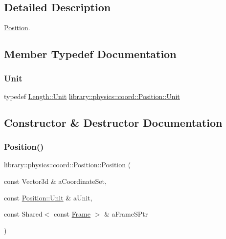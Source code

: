 \subsection{Detailed Description}
\hyperlink{classlibrary_1_1physics_1_1coord_1_1_position}{Position}. 

\subsection{Member Typedef Documentation}
\mbox{\label{classlibrary_1_1physics_1_1coord_1_1_position_aa89cc8ffbcb33e1b347e51b179183613}} 
\subsubsection{\texorpdfstring{Unit}{Unit}}
{\footnotesize\ttfamily typedef \hyperlink{classlibrary_1_1physics_1_1units_1_1_length_a3b8b39cd245cf6b19dc34459baeccb18}{Length\+::\+Unit} \hyperlink{classlibrary_1_1physics_1_1units_1_1_length_a3b8b39cd245cf6b19dc34459baeccb18}{library\+::physics\+::coord\+::\+Position\+::\+Unit}}



\subsection{Constructor \& Destructor Documentation}
\mbox{\label{classlibrary_1_1physics_1_1coord_1_1_position_ac69f2ea85b82a43db1793f7e9cb183f8}} 
\subsubsection{\texorpdfstring{Position()}{Position()}\hspace{0.1cm}{\footnotesize\ttfamily [1/2]}}
{\footnotesize\ttfamily library\+::physics\+::coord\+::\+Position\+::\+Position (\begin{DoxyParamCaption}\item[{const Vector3d \&}]{a\+Coordinate\+Set,  }\item[{const \hyperlink{classlibrary_1_1physics_1_1units_1_1_length_a3b8b39cd245cf6b19dc34459baeccb18}{Position\+::\+Unit} \&}]{a\+Unit,  }\item[{const Shared$<$ const \hyperlink{classlibrary_1_1physics_1_1coord_1_1_frame}{Frame} $>$ \&}]{a\+Frame\+S\+Ptr }\end{DoxyParamCaption})}

